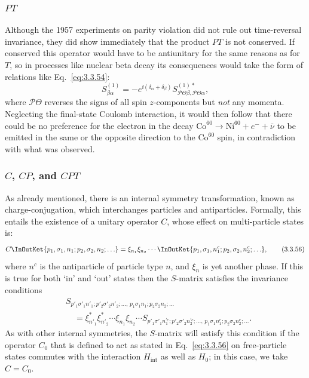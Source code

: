 \subsubsection*{$PT$}

Although the 1957 experiments on parity violation did not rule out time-reversal
invariance, they did show immediately that the product $PT$ is not conserved. If
conserved this operator would have to be antiunitary for the same reasons as for
$T$, so in processes like nuclear beta decay its consequences would take the form
of relations like Eq.~\eqref{eq:3.3.54}:
\[
S^{(1)}_{\beta\alpha}
=-e^{\ii(\delta_\alpha+\delta_\beta)}
S^{(1)*}_{\mathcal{P}\Theta\beta,\mathcal{P}\Theta\alpha},
\]
where $\mathcal{P}\Theta$ reverses the signs of all spin $z$-components but
\textit{not} any momenta. Neglecting the final-state Coulomb interaction, it would
then follow that there could be no preference for the electron in the decay
$\mathrm{Co}^{60}\to\mathrm{Ni}^{60}+e^-+\bar\nu$ to be emitted in the same or the
opposite direction to the $\mathrm{Co}^{60}$ spin, in contradiction with what was
observed.

\subsubsection*{$C$, $CP$, and $CPT$}

As already mentioned, there is an internal symmetry transformation, known as
charge-conjugation, which interchanges particles and antiparticles. Formally, this
entails the existence of a unitary operator $C$, whose effect on multi-particle
states is:
\begin{equation}
C\InOutKet{p_1,\sigma_1,n_1;p_2,\sigma_2,n_2;\ldots}
=\xi_{n_1}\xi_{n_2}\cdots
\InOutKet{p_1,\sigma_1,n_1^c;p_2,\sigma_2,n_2^c;\ldots},
\tag{3.3.56}\label{eq:3.3.56}
\end{equation}
where $n^c$ is the antiparticle of particle type $n$, and $\xi_n$ is yet another
phase. If this is true for both `in' and `out' states then the $S$-matrix satisfies
the invariance conditions
\begin{align}
&S_{p'_1\sigma'_1n'_1;p'_2\sigma'_2n'_2;\ldots,\,
p_1\sigma_1n_1;p_2\sigma_2n_2;\ldots}
\nonumber\\
&\quad=\xi^*_{n'_1}\xi^*_{n'_2}\cdots\xi_{n_1}\xi_{n_2}\cdots
S_{p'_1\sigma'_1n_1^{\prime c};p'_2\sigma'_2n_2^{\prime c};\ldots,\,
p_1\sigma_1n_1^c;p_2\sigma_2n_2^c;\ldots}.
\tag{3.3.57}\label{eq:3.3.57}
\end{align}
As with other internal symmetries, the $S$-matrix will satisfy this condition if the
operator $C_0$ that is defined to act as stated in Eq.~\eqref{eq:3.3.56} on free-particle
states commutes with the interaction $H_{\mathrm{int}}$ as well as $H_0$; in this
case, we take $C=C_0$.

